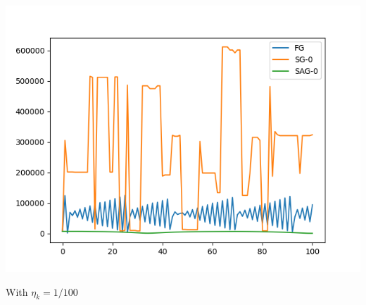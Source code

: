 \documentclass{beamer}
\numberwithin{equation}{aufgabe}
\begin{document}
\begin{frame}
    \includegraphics[width=1.0\textwidth]{images/100.png}
    \begin{center}
        With $\eta_k = 1/100$
    \end{center}
\end{frame}
\end{document}
